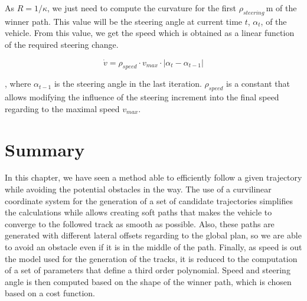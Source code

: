 


As $R = 1 / \kappa$, we just need to compute the curvature for the first $\rho_{steering}$\,m of the winner path. This value will be the steering angle at current time $t$, $\alpha_{t}$, of the vehicle. From this value, we get the speed which is obtained as a linear function of the required steering change.

\begin{equation}\label{eq:cp07_speed_computation}
\dot{v} = \rho_{speed} \cdot v_{max} \cdot | \alpha_{t} - \alpha_{t - 1}|
\end{equation}

, where $\alpha_{t - 1}$ is the steering angle in the last iteration. $\rho_{speed}$ is a constant that allows modifying the influence of the steering increment into the final speed regarding to the maximal speed $v_{max}$.

\section{Summary}\label{ch:chapter07_03}

In this chapter, we have seen a method able to efficiently follow a given trajectory while avoiding the potential obstacles in the way. The use of a curvilinear coordinate system for the generation of a set of candidate trajectories simplifies the calculations while allows creating soft paths that makes the vehicle to converge to the followed track as smooth as possible. Also, these paths are generated with different lateral offsets regarding to the global plan, so we are able to avoid an obstacle even if it is in the middle of the path. Finally, as speed is out the model used for the generation of the tracks, it is reduced to the computation of a set of parameters that define a third order polynomial. Speed and steering angle is then computed based on the shape of the winner path, which is chosen based on a cost function.

